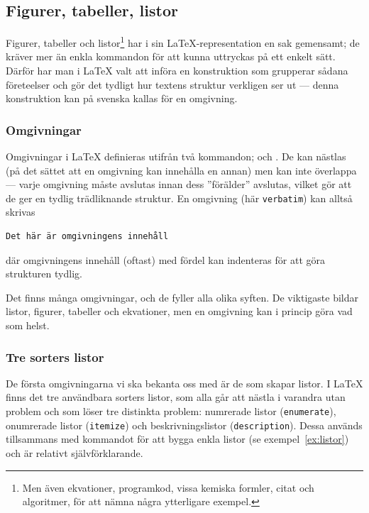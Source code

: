 \documentclass[../../latex.tex]{subfiles}
\begin{document}
\subsection{Figurer, tabeller, listor}
Figurer, tabeller och listor\footnote{Men även ekvationer, programkod,
vissa kemiska formler, citat och algoritmer, för att nämna några
ytterligare exempel.} har i sin \LaTeX-representation en sak gemensamt;
de kräver mer än enkla kommandon för att kunna uttryckas på ett enkelt
sätt. Därför har man i \LaTeX{} valt att införa en konstruktion som
grupperar sådana företeelser och gör det tydligt hur textens struktur
verkligen ser ut — denna konstruktion kan på svenska kallas för en 
omgivning.

\subsubsection{Omgivningar }\label{sec:omg}
Omgivningar i \LaTeX{} definieras utifrån två kommandon;  och
. De kan nästlas (på det sättet att en omgivning kan innehålla
en annan) men kan inte överlappa — varje omgivning måste avslutas innan
dess ”förälder” avslutas, vilket gör att de ger en tydlig trädliknande
struktur. En omgivning (här \texttt{verbatim}) kan alltså skrivas
\begin{latexcode}
\begin{verbatim}
Det här är omgivningens innehåll
\end{verbatim}
\end{latexcode}
där omgivningens innehåll (oftast) med fördel kan indenteras för att göra
strukturen tydlig.

Det finns många omgivningar, och de fyller alla olika syften. De
viktigaste bildar listor, figurer, tabeller och ekvationer, men en
omgivning kan i princip göra vad som helst.

\subsubsection{Tre sorters listor}
De första omgivningarna vi ska bekanta oss med är de som skapar listor.
I \LaTeX{} finns det tre användbara sorters listor, som alla går att
nästla i varandra utan problem och som löser tre distinkta problem:
numrerade listor (\texttt{enumerate}), onumrerade listor 
(\texttt{itemize}) och beskrivningslistor (\texttt{description}). Dessa
används tillsammans med kommandot  för att bygga enkla listor
(se exempel~\vref{ex:listor}) och är relativt självförklarande.
\end{document}
